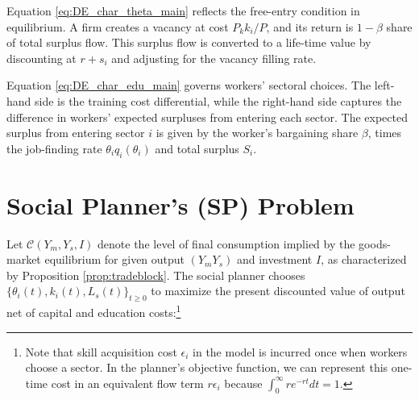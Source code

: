 \documentclass[12pt]{article} %
\theoremstyle{definition}
\begin{document}
Equation \eqref{eq:DE_char_theta_main} reflects the free-entry condition %
in equilibrium. A firm creates a vacancy at cost $P_k k_i/P$, and its return is $1-\beta$ share of total surplus flow. This surplus flow is converted to a life-time value by discounting at $r+s_i$ and adjusting for the vacancy filling rate.


Equation \eqref{eq:DE_char_edu_main} governs workers' sectoral  choices. The left-hand side is the training cost differential, while the  right-hand side
captures the difference in workers' expected surpluses from entering each sector. The expected surplus from entering sector $i$ is given by the worker's bargaining share $\beta$, times  the job-finding rate $\theta_i q_i (\theta_i)$ and total surplus $S_i$. 







\section{Social Planner’s (SP) Problem}
\label{spp analysis}



Let $\mathcal{C}(Y_m, Y_s, I)$ denote the level of final consumption implied by the goods-market equilibrium for given output $(Y_m Y_s)$ and investment  $I$, as characterized by Proposition \ref{prop:tradeblock}. The social planner chooses $\{ \theta_i(t), k_i(t), L_s(t) \}_{t \ge 0}$ to maximize the present discounted value of output net of capital and education costs:\footnote{Note that skill acquisition cost $\epsilon_i$ in the model is incurred once when workers choose a sector. In the planner's objective function, we can represent this one-time cost in an equivalent flow term $r\epsilon_i$ because $\int_0^{\infty}  re^{-rt}dt=1$. }
\end{document}
